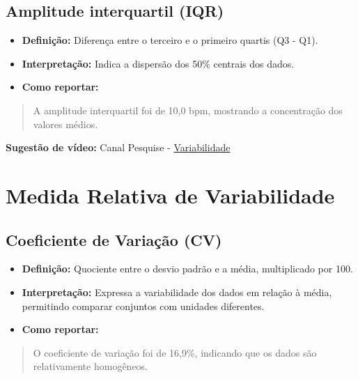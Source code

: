 \documentclass[
]{book}
\providecommand{\tightlist}{%
  \setlength{\itemsep}{0pt}\setlength{\parskip}{0pt}}
\begin{document}
\subsection{Amplitude interquartil (IQR)}\label{amplitude-interquartil-iqr}

\begin{itemize}
\tightlist
\item
  \textbf{Definição:} Diferença entre o terceiro e o primeiro quartis (Q3 - Q1).\\
\item
  \textbf{Interpretação:} Indica a dispersão dos 50\% centrais dos dados.\\
\item
  \textbf{Como reportar:}
\end{itemize}

\begin{quote}
A amplitude interquartil foi de 10,0 bpm, mostrando a concentração dos valores médios.
\end{quote}

\textbf{Sugestão de vídeo:} Canal Pesquise - \href{https://youtu.be/sISPcOIcwXs}{Variabilidade}

\section{Medida Relativa de Variabilidade}\label{medida-relativa-de-variabilidade}

\subsection{Coeficiente de Variação (CV)}\label{coeficiente-de-variauxe7uxe3o-cv}

\begin{itemize}
\tightlist
\item
  \textbf{Definição:} Quociente entre o desvio padrão e a média, multiplicado por 100.\\
\item
  \textbf{Interpretação:} Expressa a variabilidade dos dados em relação à média, permitindo comparar conjuntos com unidades diferentes.\\
\item
  \textbf{Como reportar:}
\end{itemize}

\begin{quote}
O coeficiente de variação foi de 16,9\%, indicando que os dados são relativamente homogêneos.
\end{quote}
\end{document}
